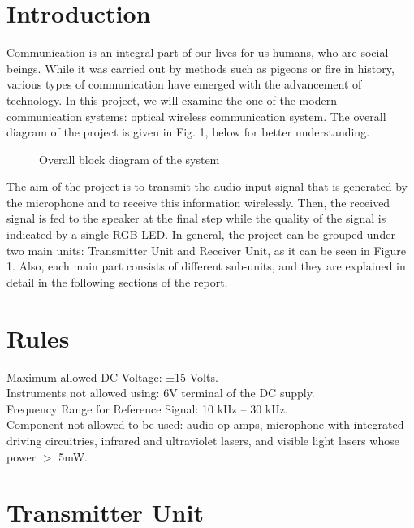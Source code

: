 \documentclass[conference]{IEEEtran}
\begin{document}
\section{Introduction}
Communication is an integral part of our lives for us humans, who are social beings. While it was carried out by methods such as pigeons or fire in history, various types of communication have emerged with the advancement of technology. In this project, we will examine the one of the modern communication systems: optical wireless communication system. The overall diagram of the project is given in Fig. 1, below for better understanding.
\begin{figure}[H]
   \centerline{}
    \caption{Overall block diagram of the system}
\end{figure}
 \par The aim of the project is to transmit the audio input signal that is generated by the microphone and to receive this information wirelessly. Then, the received signal is fed to the speaker at the final step while the quality of the signal is indicated by a single RGB LED. In general, the project can be grouped under two main units: Transmitter Unit and Receiver Unit, as it can be seen in Figure 1. Also, each main part consists of different sub-units, and they are explained in detail in the following sections of the report.
\section{Rules}
\noindent Maximum allowed DC Voltage: ±15 Volts. \\
Instruments not allowed using: 6V terminal of the DC supply.\\ 
Frequency Range for Reference Signal: 10 kHz – 30 kHz. \\
Component not allowed to be used: audio op-amps, microphone with integrated driving circuitries, infrared and ultraviolet lasers, and visible light lasers whose power \(>\) 5mW.
\section{Transmitter Unit}
\end{document}
